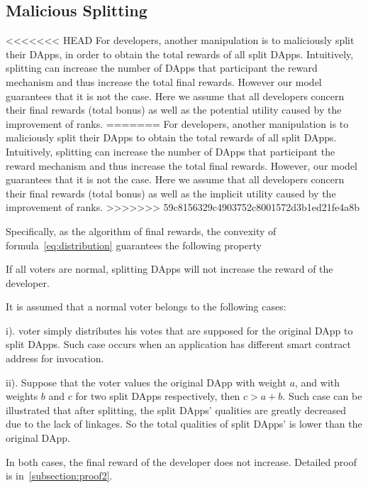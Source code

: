 \subsection{Malicious Splitting}
\label{subsec:5.2}
<<<<<<< HEAD
For developers, another manipulation is to maliciously split their DApps, in order to obtain the total rewards of all split DApps. Intuitively, splitting can increase the number of DApps that participant the reward mechanism and thus increase the total final rewards. However our model guarantees that it is not the case. Here we assume that all developers concern their final rewards (total bonus) as well as the potential utility caused by the improvement of ranks.
=======
For developers, another manipulation is to maliciously split their DApps  to obtain the total rewards of all split DApps. Intuitively, splitting can increase the number of DApps that participant the reward mechanism and thus increase the total final rewards. However, our model guarantees that it is not the case. Here we assume that all developers concern their final rewards (total bonus) as well as the implicit utility caused by the improvement of ranks.
>>>>>>> 59c8156329c4903752c8001572d3b1ed21fe4a8b

Specifically, as the algorithm of final rewards, the convexity of formula~\ref{eq:distribution} guarantees the following property
\begin{property}
	\label{p2}
    If all voters are normal, splitting DApps will not increase the reward of the developer.
\end{property}

It is assumed that a normal voter belongs to the following cases:
\begin{inparaenum}
\item[i).] voter simply distributes his votes that are supposed for the original DApp to split DApps. Such case occurs when an application has different smart contract address for invocation.
\item[ii).] Suppose that the voter values the original DApp with weight $a$, and with weights $b$ and $c$ for two split DApps respectively, then $c>a+b$. Such case can be illustrated that after splitting, the split DApps' qualities are greatly decreased due to the lack of linkages. So the total qualities of split DApps' is lower than the original DApp.
 \end{inparaenum}

  In both cases, the final reward of the developer does not increase. Detailed proof  is in~\ref{subsection:proof2}.

